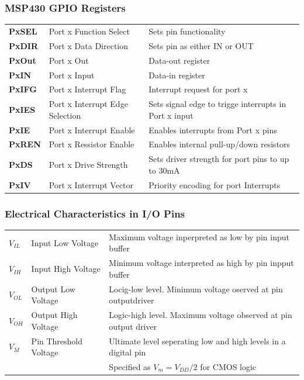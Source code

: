 \subsubsection{MSP430 GPIO Registers}
\begin{tabular}{>{\bfseries}lll}
	PxSEL   &Port x Function Select             & Sets pin functionality  \\ 
	PxDIR   &Port x Data Direction              & Sets pin as either IN or OUT \\ 
	PxOut   &Port x Out                         & Data-out register \\ 
	PxIN    &Port x Input                       & Data-in register  \\ 
	PxIFG   &Port x Interrupt Flag              & Interrupt request for port x \\ 
	PxIES   &Port x Interrupt Edge Selection    & Sets signal edge to trigge interrupts in Port x input  \\ 
	PxIE    &Port x Interrupt Enable            & Enables interrupts from Port x pins \\ 
	PxREN   &Port x Ressistor Enable            & Enables internal pull-up/down resistors \\ 
	PxDS    &Port x Drive Strength              & Sets driver strength for port pins to up to 30mA  \\ 
	PxIV    &Port x Interrupt Vector            & Priority encoding for port Interrupts \\ 
\end{tabular} 

\subsubsection{Electrical Characteristics in I/O Pins}
\begin{tabular}{lll}
	$ V_{IL} $& Input Low Voltage&Maximum voltage inperpreted as low by pin input buffer\\
	$ V_{IH} $& Input High Voltage& Minimum voltage interpreted as high by pin inpput buffer\\
	$ V_{OL} $& Output Low Voltage& Locig-low level. Minimum voltage oserved at pin outputdriver\\
	$ V_{OH} $& Output High Voltage& Logic-high level. Maximum voltage observed at pin output driver\\
	$ V_M $   & Pin Threshold Voltage& Ultimate level seperating low and high levels in a digital pin\\
	&                      & Specified as $ V_m=V_{DD}/2 $ for CMOS logic\\
\end{tabular} 

\clearpage